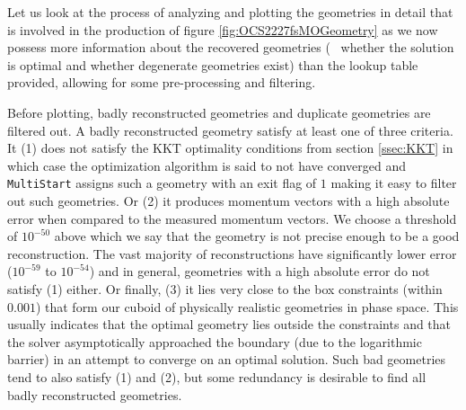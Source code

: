 Let us look at the process of analyzing and plotting the geometries in detail that is involved in the production of figure \ref{fig:OCS2227fsMOGeometry} as we now possess more information about the recovered geometries (\eg~ whether the solution is optimal and whether degenerate geometries exist) than the lookup table provided, allowing for some pre-processing and filtering.

Before plotting, badly reconstructed geometries and duplicate geometries are filtered out. A badly reconstructed geometry satisfy at least one of three criteria. It (1) does not satisfy the KKT optimality conditions from section \ref{ssec:KKT} in which case the optimization algorithm is said to not have converged and \texttt{MultiStart} assigns such a geometry with an exit flag of $1$ making it easy to filter out such geometries. Or (2) it produces momentum vectors with a high absolute error when compared to the measured momentum vectors. We choose a threshold of $10^{-50}$ above which we say that the geometry is not precise enough to be a good reconstruction. The vast majority of reconstructions have significantly lower error ($10^{-59}$ to $10^{-54}$) and in general, geometries with a high absolute error do not satisfy (1) either. Or finally, (3) it lies very close to the box constraints (within $0.001$) that form our cuboid of physically realistic geometries in phase space. This usually indicates that the optimal geometry lies outside the constraints and that the solver asymptotically approached the boundary (due to the logarithmic barrier) in an attempt to converge on an optimal solution. Such bad geometries tend to also satisfy (1) and (2), but some redundancy is desirable to find all badly reconstructed geometries.
 
